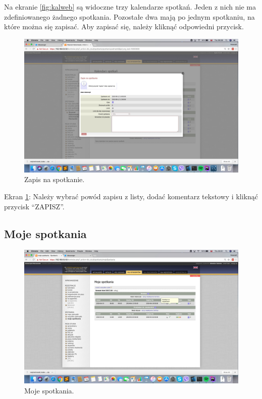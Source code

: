 \documentclass[licencjacka]{pracamgr}
\begin{document}
Na ekranie \ref{fig:kalweb} są widoczne trzy kalendarze spotkań. Jeden z nich nie ma zdefiniowanego żadnego spotkania. Pozostałe dwa mają po jednym spotkaniu, na które można się zapisać. Aby zapisać się, należy kliknąć odpowiedni przycisk.

\begin{figure}[!]
  \includegraphics[width=\linewidth]{zapisUSOSweb.jpg}
  \caption{Zapis na spotkanie.}
  \label{fig:zapisweb}
\end{figure} %

Ekran \ref{fig:zapisweb}: Należy wybrać powód zapisu z listy, dodać komentarz tekstowy i kliknąć przycisk \enquote{ZAPISZ}.

\subsection{Moje spotkania}

\begin{figure}[!]
  \includegraphics[width=\linewidth]{mojeSpotkaniaUSOSweb.jpg}
  \caption{Moje spotkania.}
  \label{fig:mojeweb}
\end{figure}
\end{document}
